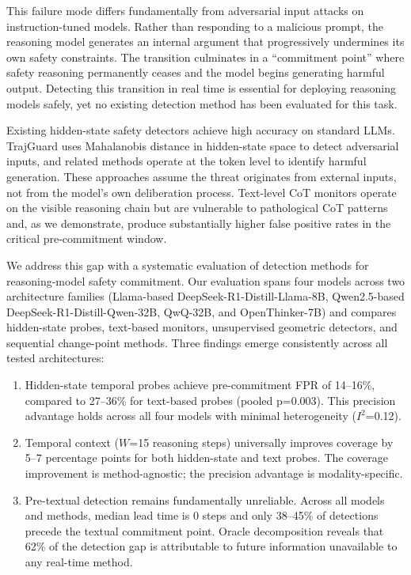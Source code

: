 \documentclass[11pt,a4paper]{article}
\begin{document}
This failure mode differs fundamentally from adversarial input attacks on instruction-tuned models. Rather than responding to a malicious prompt, the reasoning model generates an internal argument that progressively undermines its own safety constraints. The transition culminates in a ``commitment point'' where safety reasoning permanently ceases and the model begins generating harmful output. Detecting this transition in real time is essential for deploying reasoning models safely, yet no existing detection method has been evaluated for this task.

Existing hidden-state safety detectors achieve high accuracy on standard LLMs. TrajGuard \cite{trajguard} uses Mahalanobis distance in hidden-state space to detect adversarial inputs, and related methods \cite{safeswitch, siren} operate at the token level to identify harmful generation. These approaches assume the threat originates from external inputs, not from the model's own deliberation process. Text-level CoT monitors \cite{saferemind, safethink} operate on the visible reasoning chain but are vulnerable to pathological CoT patterns and, as we demonstrate, produce substantially higher false positive rates in the critical pre-commitment window.

We address this gap with a systematic evaluation of detection methods for reasoning-model safety commitment. Our evaluation spans four models across two architecture families (Llama-based DeepSeek-R1-Distill-Llama-8B, Qwen2.5-based DeepSeek-R1-Distill-Qwen-32B, QwQ-32B, and OpenThinker-7B) and compares hidden-state probes, text-based monitors, unsupervised geometric detectors, and sequential change-point methods. Three findings emerge consistently across all tested architectures:

\begin{enumerate}
\item Hidden-state temporal probes achieve pre-commitment FPR of 14--16\%, compared to 27--36\% for text-based probes (pooled p=0.003). This precision advantage holds across all four models with minimal heterogeneity ($I^2$=0.12).

\item Temporal context ($W$=15 reasoning steps) universally improves coverage by 5--7 percentage points for both hidden-state and text probes. The coverage improvement is method-agnostic; the precision advantage is modality-specific.

\item Pre-textual detection remains fundamentally unreliable. Across all models and methods, median lead time is 0 steps and only 38--45\% of detections precede the textual commitment point. Oracle decomposition reveals that 62\% of the detection gap is attributable to future information unavailable to any real-time method.
\end{enumerate}
\end{document}
